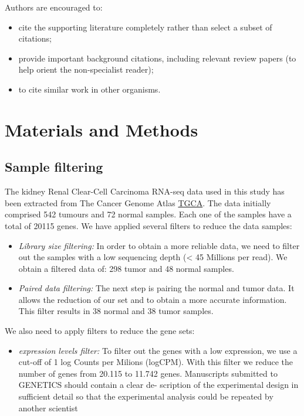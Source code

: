 \documentclass[9pt,twocolumn,twoside]{gsajnl}
\begin{document}
Authors are encouraged to:

\begin{itemize}
\item cite the supporting literature completely rather than select a subset of citations;
\item provide important background citations, including relevant review papers (to help orient the non-specialist reader);
\item to cite similar work in other organisms.
\end{itemize}

\section*{Materials and Methods}

\subsection*{Sample filtering}
The kidney Renal Clear-Cell Carcinoma RNA-seq data used in this study has been extracted from The Cancer Genome Atlas \href{<http://cancergenome.nih.gov>}{TGCA}. The data initially comprised 542 tumours and 72 normal samples. Each one of the samples have a total of 20115 genes. We have applied several filters to reduce the data samples:
\begin{itemize}
\item \textit{ Library size filtering:} In order to obtain a more reliable data, we need to filter out the samples with a low sequencing depth (< 45 Millions per read). We obtain a filtered data of: 298 tumor and 48 normal samples.
\item \textit{Paired data filtering:} The next step is pairing the normal and tumor data. It allows the reduction of our set and to obtain a more accurate information. This filter results in 38 normal and 38 tumor samples.
\end{itemize}
We also need to apply filters to reduce the gene sets:
\begin{itemize}
\item \textit{ expression levels filter:} To filter out the genes with a low expression, we use a cut-off of 1 log Counts per Milions (logCPM). With this filter we reduce the number of genes from 20.115 to 11.742 genes.
Manuscripts submitted to GENETICS should contain a clear de- scription of the experimental design in sufficient detail so that the experimental analysis could be repeated by another scientist
\end{itemize}
\end{document}
